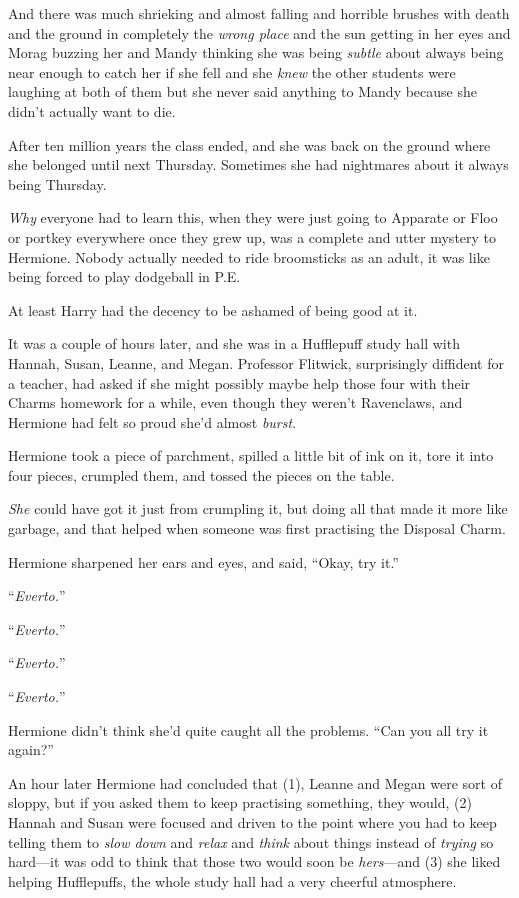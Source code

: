And there was much shrieking and almost falling and horrible brushes with death and the ground in completely the \emph{wrong place} and the sun getting in her eyes and Morag buzzing her and Mandy thinking she was being \emph{subtle} about always being near enough to catch her if she fell and she \emph{knew} the other students were laughing at both of them but she never said anything to Mandy because she didn’t actually want to die.

After ten million years the class ended, and she was back on the ground where she belonged until next Thursday. Sometimes she had nightmares about it always being Thursday.

\emph{Why} everyone had to learn this, when they were just going to Apparate or Floo or portkey everywhere once they grew up, was a complete and utter mystery to Hermione. Nobody actually needed to ride broomsticks as an adult, it was like being forced to play dodgeball in P.E.

At least Harry had the decency to be ashamed of being good at it.

\later

It was a couple of hours later, and she was in a Hufflepuff study hall with Hannah, Susan, Leanne, and Megan. Professor Flitwick, surprisingly diffident for a teacher, had asked if she might possibly maybe help those four with their Charms homework for a while, even though they weren’t Ravenclaws, and Hermione had felt so proud she’d almost \emph{burst}.

Hermione took a piece of parchment, spilled a little bit of ink on it, tore it into four pieces, crumpled them, and tossed the pieces on the table.

\emph{She} could have got it just from crumpling it, but doing all that made it more like garbage, and that helped when someone was first practising the Disposal Charm.

Hermione sharpened her ears and eyes, and said, “Okay, try it.”

“\emph{Everto.}”

“\emph{Everto.}”

“\emph{Everto.}”

“\emph{Everto.}”

Hermione didn’t think she’d quite caught all the problems. “Can you all try it again?”

An hour later Hermione had concluded that (1), Leanne and Megan were sort of sloppy, but if you asked them to keep practising something, they would, (2) Hannah and Susan were focused and driven to the point where you had to keep telling them to \emph{slow down} and \emph{relax} and \emph{think} about things instead of \emph{trying} so hard—it was odd to think that those two would soon be \emph{hers}—and (3) she liked helping Hufflepuffs, the whole study hall had a very cheerful atmosphere.

